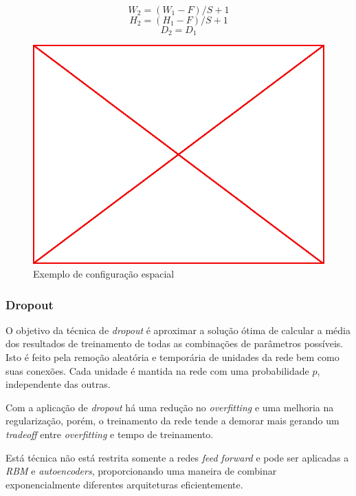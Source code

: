 $$W_2 = (W_1 - F)/S + 1$$
$$H_2 = (H_1 - F)/S + 1$$
$$D_2 = D_1$$
\begin{figure}
  \caption{Exemplo de configuração espacial}
  \begin{center}
    \includegraphics[scale=0.5]{placeholder}
  \end{center}
\end{figure}
\subsubsection{Dropout}

O objetivo da técnica de \emph{dropout} é aproximar a solução ótima de calcular
a média dos resultados de treinamento de todas as combinações de parâmetros
possíveis. Isto é feito pela remoção aleatória e temporária de unidades da rede
bem como suas conexões. Cada unidade é mantida na rede com uma probabilidade
$p$, independente das outras.\cite{srivastava2014dropout}

Com a aplicação de \emph{dropout} há uma redução no \emph{overfitting} e uma
melhoria na regularização, porém, o treinamento da rede tende a demorar mais
gerando um \emph{tradeoff} entre \emph{overfitting} e tempo de
treinamento.\cite{srivastava2014dropout}

Está técnica não está restrita somente a redes \emph{feed forward} e pode ser
aplicadas a \emph{RBM} e \emph{autoencoders}, proporcionando uma maneira de
combinar exponencialmente diferentes arquiteturas
eficientemente.\cite{srivastava2014dropout}


